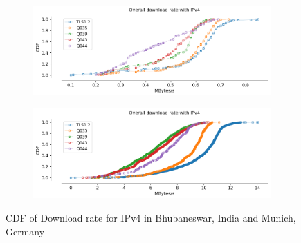 \begin{frame}
\begin{figure}[!htb]
    \begin{subfigure}{0.45\textwidth}
        \includegraphics[width=\linewidth]{./plots/youtube/india/graph_download_rate.png}
    \end{subfigure}
    \begin{subfigure}{0.45\textwidth}
        \includegraphics[width=\linewidth]{./plots/youtube/munich/graph_download_rate.png}
    \end{subfigure}    
    \caption{CDF of Download rate for IPv4 in Bhubaneswar, India and Munich, Germany}\label{fig:cdf-of-download}
\end{figure}

\end{frame}
\clearpage

